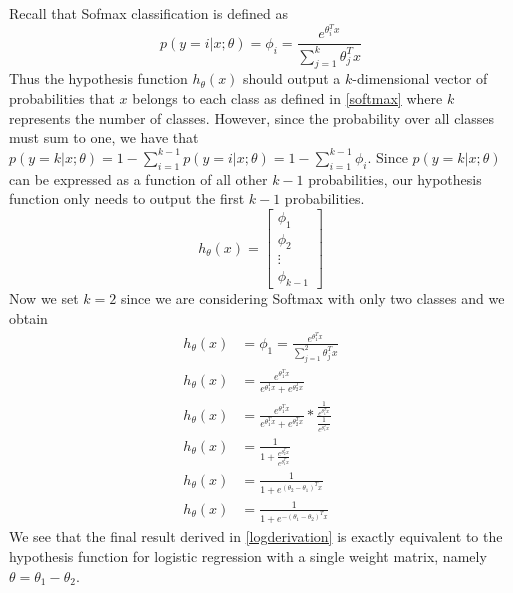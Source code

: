 \documentclass{article}
\begin{document}
Recall that Sofmax classification is defined as
\begin{equation}\label{softmax}
p(y=i|x;\theta) = \phi_{i} = \frac{e^{\theta^T_{i}x}}{\sum_{j=1}^k \theta^T_{j}x}
\end{equation}
Thus the hypothesis function \( h_{\theta}(x) \) should output a \(k\)-dimensional vector of probabilities that \(x\) belongs to each class as defined in \eqref{softmax} where \(k\) represents the number of classes.  However, since the probability over all classes must sum to one, we have that \(p(y=k|x;\theta) = 1 - \sum_{i=1}^{k-1} p(y=i|x;\theta) = 1 -\sum_{i=1}^{k-1}  \phi_{i}\).  Since \(p(y=k|x;\theta)\) can be expressed as a function of all other \(k-1\) probabilities, our hypothesis function only needs to output the first \(k-1\) probabilities.
\begin{equation}
h_{\theta}(x) = \begin{bmatrix}  \phi_{1}\\  \phi_{2} \\ \vdots \\ \phi_{k-1}\end{bmatrix}
\end{equation}
Now we set \(k=2\) since we are considering Softmax with only two classes and we obtain
\begin{equation}
\begin{aligned}\label{logderivation}
h_{\theta}(x) &= \phi_{1} = \frac{e^{\theta^T_{1}x}}{\sum_{j=1}^2 \theta^T_{j}x} \\
h_{\theta}(x) &= \frac{e^{\theta^T_{1}x}}{e^{\theta^T_{1}x}+e^{\theta^T_{2}x}} \\
h_{\theta}(x) &= \frac{e^{\theta^T_{1}x}}{e^{\theta^T_{1}x}+e^{\theta^T_{2}x}} * \frac{\frac{1}{e^{\theta^T_{1}x}}}{\frac{1}{e^{\theta^T_{1}x}}} \\
h_{\theta}(x) &= \frac{1}{1+\frac{e^{\theta^T_{2}x}}{e^{\theta^T_{1}x}}} \\
h_{\theta}(x) &= \frac{1}{1+e^{\left(\theta_{2}-\theta_{1}\right)^Tx}} \\
h_{\theta}(x) &= \frac{1}{1+e^{-\left(\theta_{1}-\theta_{2}\right)^Tx}}
\end{aligned}
\end{equation}
We see that the final result derived in \eqref{logderivation} is exactly equivalent to the hypothesis function for   logistic regression with a single weight matrix, namely \(\theta = \theta_{1}-\theta_{2} \).
\end{document}
